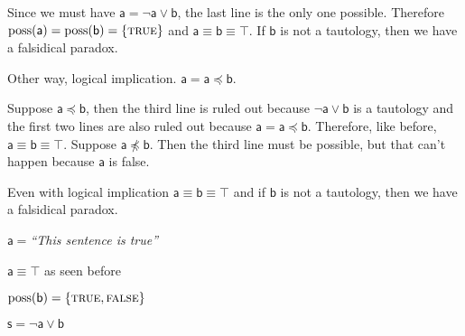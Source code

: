 \documentclass[letterpaper]{article}
\theoremstyle{plain}%
\theoremstyle{definition}
\theoremstyle{remark}
\DeclareMathOperator{\possFn}{poss}
\def\TRUE{\textsc{true}}
\def\FALSE{\textsc{false}}
\def\tautology{\top}
\def\narrower{\preccurlyeq}
\def\nnarrower{\npreccurlyeq}
\def\OR{\vee}
\def\NOT{\neg}
\newcommand{\stmt}[1][s] {\mathsf{#1}}
\newcommand{\statement}[1] {\emph{``#1''}}
\begin{document}
Since we must have $\stmt[a]=\NOT \stmt[a] \OR \stmt[b]$, the last line is the only one possible. Therefore $\possFn(\stmt[a])=\possFn(\stmt[b])=\{\TRUE\}$ and $\stmt[a]\equiv\stmt[b]\equiv\tautology$. If $\stmt[b]$ is not a tautology, then we have a falsidical paradox.

Other way, logical implication. $\stmt[a]=\stmt[a] \narrower \stmt[b]$.

Suppose $\stmt[a] \narrower \stmt[b]$, then the third line is ruled out because $\NOT \stmt[a] \OR \stmt[b]$ is a tautology and the first two lines are also ruled out because $\stmt[a]=\stmt[a] \narrower \stmt[b]$. Therefore, like before, $\stmt[a]\equiv\stmt[b]\equiv\tautology$. Suppose $\stmt[a] \nnarrower \stmt[b]$. Then the third line must be possible, but that can't happen because $\stmt[a]$ is false.

Even with logical implication $\stmt[a]\equiv\stmt[b]\equiv\tautology$ and if $\stmt[b]$ is not a tautology, then we have a falsidical paradox.


$\stmt[a]=$\statement{This sentence is true}

$\stmt[a] \equiv \tautology$ as seen before

$\possFn(\stmt[b]) = \{\TRUE, \FALSE\}$

$\stmt = \NOT \stmt[a] \OR \stmt[b]$









\end{document}
